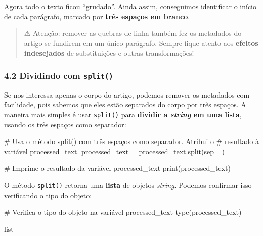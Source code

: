 \documentclass[
  brazilian,
  11pt,
]{article}
\newenvironment{Shaded}{\begin{snugshade}}{\end{snugshade}}
\newcommand{\BuiltInTok}[1]{\textcolor[rgb]{0.50,0.55,0.55}{#1}}
\newcommand{\CommentTok}[1]{\textcolor[rgb]{0.48,0.49,0.49}{#1}}
\newcommand{\NormalTok}[1]{\textcolor[rgb]{0.81,0.81,0.76}{#1}}
\newcommand{\OperatorTok}[1]{\textcolor[rgb]{0.81,0.81,0.76}{#1}}
\newcommand{\StringTok}[1]{\textcolor[rgb]{0.96,0.31,0.31}{#1}}
\let\oldtexttt\texttt
\renewcommand{\texttt}[1]{{\color{inlink}\oldtexttt{#1}}}
\begin{document}
Agora todo o texto ficou ``grudado''. Ainda assim, conseguimos
identificar o início de cada parágrafo, marcado por \textbf{três espaços
em branco}.

\begin{quote}
⚠ Atenção: remover as quebras de linha também fez os metadados do artigo
se fundirem em um único parágrafo. Sempre fique atento aos
\textbf{efeitos indesejados} de substituições e outras transformações!
\end{quote}

\subsubsection{\texorpdfstring{4.2 Dividindo com
\texttt{split()}}{4.2 Dividindo com split()}}\label{dividindo-com-split}

Se nos interessa apenas o corpo do artigo, podemos remover os metadados
com facilidade, pois sabemos que eles estão separados do corpo por três
espaços. A maneira mais simples é usar \texttt{split()} para
\textbf{dividir a \emph{string} em uma lista}, usando os três espaços
como separador:

\begin{Shaded}
\begin{Highlighting}[]
\CommentTok{\# Usa o método split() com três espaços como separador. Atribui o}
\CommentTok{\# resultado à variável \textquotesingle{}processed\_text\textquotesingle{}.}
\NormalTok{processed\_text }\OperatorTok{=}\NormalTok{ processed\_text.split(sep}\OperatorTok{=}\StringTok{\textquotesingle{}   \textquotesingle{}}\NormalTok{)}

\CommentTok{\# Imprime o resultado da variável \textquotesingle{}processed\_text\textquotesingle{}}
\BuiltInTok{print}\NormalTok{(processed\_text)}
\end{Highlighting}
\end{Shaded}

O método \texttt{split()} retorna uma \textbf{lista} de objetos
\emph{string}. Podemos confirmar isso verificando o tipo do objeto:

\begin{Shaded}
\begin{Highlighting}[]
\CommentTok{\# Verifica o tipo do objeto na variável \textquotesingle{}processed\_text\textquotesingle{}}
\BuiltInTok{type}\NormalTok{(processed\_text)}
\end{Highlighting}
\end{Shaded}

\begin{Shaded}
\begin{Highlighting}[]
\NormalTok{list}
\end{Highlighting}
\end{Shaded}
\end{document}
